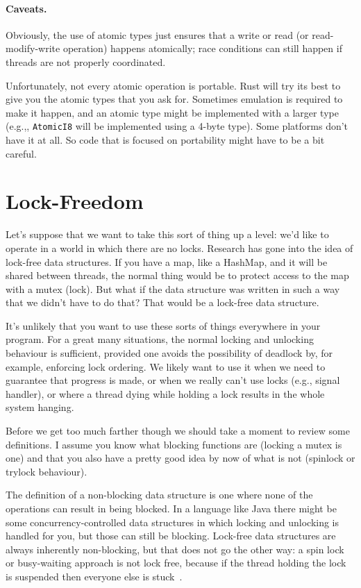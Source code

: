 \documentclass[a4paper]{report}
\begin{document}
\paragraph{Caveats.}
Obviously, the use of atomic types just ensures that a write or read (or read-modify-write operation) happens atomically; race conditions can still happen if threads are not properly coordinated.


Unfortunately, not every atomic operation is portable. Rust will try its best to give you the atomic types that you ask for. Sometimes emulation is required to make it happen, and an atomic type might be implemented with a larger type (e.g.,, \texttt{AtomicI8} will be implemented using a 4-byte type). Some platforms don't have it at all. So code that is focused on portability might have to be a bit careful.

\section*{Lock-Freedom}

Let's suppose that we want to take this sort of thing up a level: we'd like to operate in a world in which there are no locks. Research has gone into the idea of lock-free data structures. If you have a map, like a HashMap, and it will be shared between threads, the normal thing would be to protect access to the map with a mutex (lock). But what if the data structure was written in such a way that we didn't have to do that? That would be a lock-free data structure.

It's unlikely that you want to use these sorts of things everywhere in your program. For a great many situations, the normal locking and unlocking behaviour is sufficient, provided one avoids the possibility of deadlock by, for example, enforcing lock ordering. We likely want to use it when we need to guarantee that progress is made, or when we really can't use locks (e.g., signal handler), or where a thread dying while holding a lock results in the whole system hanging.

Before we get too much farther though we should take a moment to review some definitions. I assume you know what blocking functions are (locking a mutex is one) and that you also have a pretty good idea by now of what is not (spinlock or trylock behaviour). 

The definition of a non-blocking data structure is one where none of the operations can result in being blocked. In a language like Java there might be some concurrency-controlled data structures in which locking and unlocking is handled for you, but those can still be blocking. Lock-free data structures are always inherently non-blocking, but that does not go the other way: a spin lock or busy-waiting approach is not lock free, because if the thread holding the lock is suspended then everyone else is stuck~\cite{nblfwf}.
\end{document}
